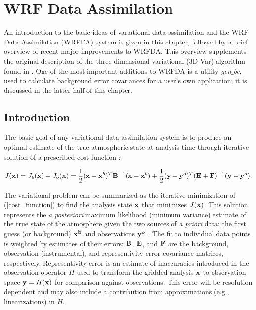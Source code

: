 \chapter{WRF Data Assimilation}
\label{var_chap}

An introduction to the basic ideas of variational data assimilation and
the WRF Data Assimilation (WRFDA) system \citep{barker12} is given in this chapter, followed by a brief
overview of recent major improvements to WRFDA.  This overview
supplements the original description of the three-dimensional
variational (3D-Var) algorithm found in \citet{barker04}.  One of the
most important additions to WRFDA is a utility {\it gen$\_$be},
used to calculate background error covariances for a user's own
application; it is discussed in the latter half of this chapter.

\section{Introduction}
\label{var-intro}

The basic goal of any variational data assimilation system is to produce
an optimal estimate of the true atmospheric state at analysis time
through iterative solution of a prescribed cost-function \citep{ide97}:

\begin{equation}
J({\bf x}) = J_b({\bf x}) + J_o({\bf x}) = \frac{1}{2 
} ({\bf x}-{\bf x}^{b})^{T}{\bf B}^{-1}({\bf x}-{\bf x}^{b}) + 
\frac{1}{2}
({\bf y}-{\bf y}^{o})^{T}({\bf E+F})^{-1}({\bf y}-{\bf y}^{o}).
\label{cost_function}
\end{equation}

The variational problem can be summarized as the iterative minimization
of (\ref{cost_function}) to find the analysis state ${\bf x}$ that
minimizes $J({\bf x})$. This solution represents the {\it a posteriori}
maximum likelihood (minimum variance) estimate of the true state of the
atmosphere given the two sources of {\it a priori} data: the first guess
(or background) ${\bf x^{b}}$ and observations ${\bf y^{o}}$
\citep{lorenc86}. The fit to individual data points is weighted by
estimates of their errors: ${\bf B}$, ${\bf E}$, and ${\bf F}$ are the
background, observation (instrumental), and representivity error
covariance matrices, respectively. Representivity error is an estimate of
inaccuracies introduced in the observation operator $H$ used to
transform the gridded analysis ${\bf x}$ to observation space ${\bf
y}=H({\bf x})$ for comparison against observations. This error will be
resolution dependent and may also include a contribution from
approximations (e.g., linearizations) in $H$.

